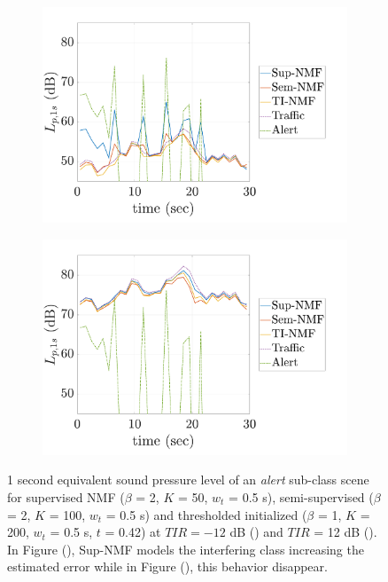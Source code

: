 \documentclass[twocolumn,a4paper,10pt]{article}
\begin{document}
\begin{figure}[t]
    \centering
    \begin{subfigure}[t]{0.45\textwidth}
        \centering
        \includegraphics[width=\linewidth]{figures/NMF_Lp_alert-12.pdf}
        \caption{}
        \label{fig:lp_alert_-12}
    \end{subfigure}%
    \hfill
    \begin{subfigure}[t]{0.45\textwidth}
        \centering
        \includegraphics[width=\linewidth]{figures/NMF_Lp_alert12.pdf}
        \caption{}
        \label{fig:lp_alert_12}
    \end{subfigure}

    \caption{1 second equivalent sound pressure level of an \textit{alert} sub-class scene for supervised NMF ($\beta$ = 2, $K$ = 50, $w_t$ = 0.5 s), semi-supervised ($\beta$ = 2, $K$ = 100, $w_t$ = 0.5 s) and thresholded initialized ($\beta$ = 1, $K$ = 200, $w_t$ = 0.5 s, $t$ = 0.42) at $TIR = -12$ dB () and $TIR$ = 12 dB (). In Figure (), Sup-NMF models the interfering class increasing the estimated error while in Figure (), this behavior disappear.}
    \label{fig:lp_alert}
\end{figure}
\end{document}
